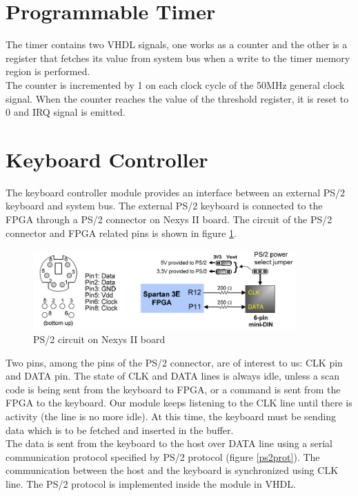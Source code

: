 \documentclass[oneside]{book}
\begin{document}
\section {Programmable Timer}

The timer contains two VHDL signals, one works as a counter and the other
is a register that fetches its value from system bus when a write
to the timer memory region is performed.\\

The counter is incremented by 1 on each clock cycle of the 50MHz general
clock signal. When the counter reaches the value of the threshold
register, it is reset to 0 and IRQ signal is emitted.

\section {Keyboard Controller}

The keyboard controller module provides an interface between an external
PS/2 keyboard and system bus. The external PS/2 keyboard is connected
to the FPGA through a PS/2 connector on Nexys II board. The circuit
of the PS/2 connector and FPGA related pins is shown in figure \ref{ps2port}.

\begin{figure}[H]
\begin{center}
\includegraphics[width=0.9\textwidth]{ps2port.png}
\end{center}
\caption{PS/2 circuit on Nexys II board}
\label{ps2port}
\end{figure}

Two pins, among the pins of the PS/2 connector, are of interest to us: CLK
pin and DATA pin. The state of CLK and DATA lines is always idle, unless
a scan code is being sent from the keyboard to FPGA, or a command is sent
from the FPGA to the keyboard. Our module keeps listening to the CLK line
until there is activity (the line is no more idle). At this time, the
keyboard must be sending data which is to be fetched and inserted
in the buffer.\\

The data is sent from the keyboard to the host over DATA line using a serial
communication protocol specified by PS/2 protocol (figure \ref{ps2prot}).
The communication between the host and the keyboard is synchronized
using CLK line. The PS/2 protocol is implemented inside the module
in VHDL.
\end{document}
